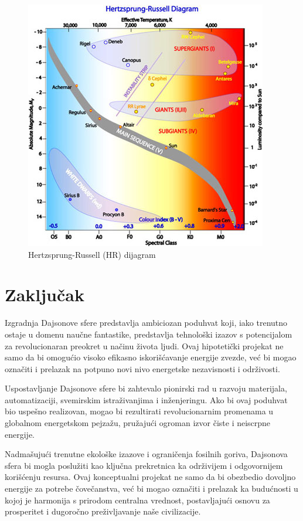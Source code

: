 \documentclass[a4paper]{article}
\begin{document}
\begin{figure}[h!]
\begin{center}
\includegraphics[scale=0.6]{HRdijagram.jpg}
\end{center}
\caption{Hertzsprung-Russell (HR) dijagram}
\label{slika:hr_dijagram}
\end{figure}


\section{Zaključak}
Izgradnja Dajsonove sfere predstavlja ambiciozan poduhvat koji, iako trenutno ostaje u domenu naučne fantastike, predstavlja tehnološki izazov s potencijalom za revolucionaran preokret u načinu života ljudi. Ovaj hipotetički projekat ne samo da bi omogućio visoko efikasno iskorišćavanje energije zvezde, već bi mogao označiti i prelazak na potpuno novi nivo energetske nezavisnosti i održivosti.

Uspostavljanje Dajsonove sfere bi zahtevalo pionirski rad u razvoju materijala, automatizaciji, svemirskim istraživanjima i inženjeringu. Ako bi ovaj poduhvat bio uspešno realizovan, mogao bi rezultirati revolucionarnim promenama u globalnom energetskom pejzažu, pružajući ogroman izvor čiste i neiscrpne energije.

Nadmašujući trenutne ekološke izazove i ograničenja fosilnih goriva, Dajsonova sfera bi mogla poslužiti kao ključna prekretnica ka održivijem i odgovornijem korišćenju resursa. Ovaj konceptualni projekat ne samo da bi obezbedio dovoljno energije za potrebe čovečanstva, već bi mogao označiti i prelazak ka budućnosti u kojoj je harmonija s prirodom centralna vrednost, postavljajući osnovu za prosperitet i dugoročno preživljavanje naše civilizacije.
\end{document}
